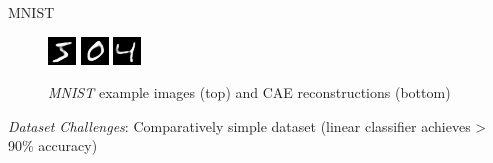 \documentclass[final]{beamer}
\newlength{\onecolwid}
\newlength{\threecolwid}
\begin{document}
\begin{frame}[t]
\begin{columns}[t]
\begin{column}{\threecolwid}
\begin{columns}[T, totalwidth=\threecolwid]
\begin{column}{\onecolwid}
\begin{block}{MNIST}
\begin{figure}
\includegraphics[width=0.2\linewidth]{graphics/reconstructions/mnist/reconstruction_00.png}
\includegraphics[width=0.2\linewidth]{graphics/reconstructions/mnist/reconstruction_01.png}
\includegraphics[width=0.2\linewidth]{graphics/reconstructions/mnist/reconstruction_02.png}

\caption{\emph{MNIST} example images (top) and CAE reconstructions (bottom)}

\end{figure}

\emph{Dataset Challenges}: Comparatively simple dataset (linear classifier achieves > 90\% accuracy)

\end{block}
\end{column}


\end{columns}
\end{column}
\end{columns}
\end{frame}
\end{document}
